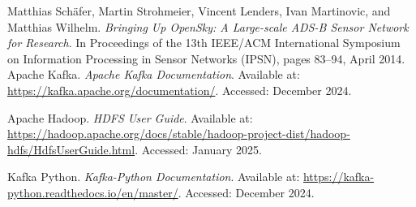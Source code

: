 \documentclass{article}
\begin{document}
\newpage

\begin{thebibliography}{9}

Matthias Schäfer, Martin Strohmeier, Vincent Lenders, Ivan Martinovic, and Matthias Wilhelm.
\textit{Bringing Up OpenSky: A Large-scale ADS-B Sensor Network for Research}.
In Proceedings of the 13th IEEE/ACM International Symposium on Information Processing in Sensor Networks (IPSN), pages 83--94, April 2014.
Apache Kafka.
\textit{Apache Kafka Documentation}.
Available at: \url{https://kafka.apache.org/documentation/}.
Accessed: December 2024.

Apache Hadoop.
\textit{HDFS User Guide}.
Available at: \url{https://hadoop.apache.org/docs/stable/hadoop-project-dist/hadoop-hdfs/HdfsUserGuide.html}.
Accessed: January 2025.

Kafka Python.
\textit{Kafka-Python Documentation}.
Available at: \url{https://kafka-python.readthedocs.io/en/master/}.
Accessed: December 2024.

\end{thebibliography}
\end{document}

